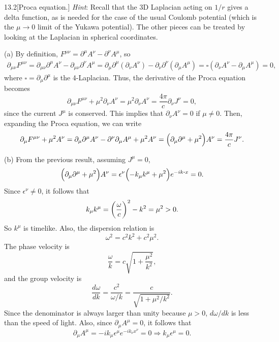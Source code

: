 \documentclass[12pt]{article}
\begin{document}
\begin{problem}{13.2}[Proca equation.]
\textit{Hint}: Recall that the 3D Laplacian acting on $1/r$ gives a delta
function, as is needed for the case of the usual Coulomb potential (which is the
$\mu\to0$ limit of the Yukawa potential). The other pieces can be treated by
looking at the Laplacian in spherical coordinates.
\begin{solution}
(a) By definition, $F^{\mu\nu}=\partial^\mu A^\nu-\partial^\nu A^\mu$, so
\begin{align}
    \partial_{\mu\nu} F^{\mu\nu} 
    =\partial_{\mu\nu}\partial^\mu A^\nu-\partial_{\mu\nu}\partial^\nu A^\mu
    =\partial_\mu\partial^\mu(\partial_\nu A^\nu)
    -\partial_\nu\partial^\nu(\partial_\mu A^\mu)
    =\square(\partial_\nu A^\nu-\partial_\mu A^\mu)
    =0,
\end{align}
where $\square=\partial_\mu\partial^\mu$ is the 4-Laplacian. Thus, the
derivative of the Proca equation becomes
\begin{equation}
    \partial_{\mu\nu}F^{\mu\nu}+\mu^2\partial_\nu A^\nu
    =\mu^2\partial_\nu A^\nu=\frac{4\pi}{c}\partial_\nu J^\nu=0,
\end{equation}
since the current $J^\mu$ is conserved. This implies that $\partial_\nu A^\nu=0$
if $\mu\neq0$. Then, expanding the Proca equation, we can write
\begin{equation}
    \partial_\mu F^{\mu\nu}+\mu^2A^\nu=\partial_\mu\partial^\mu A^\nu
    -\partial^\nu\partial_\mu A^\mu+\mu^2A^\nu
    =\qty(\partial_\mu\partial^\mu+\mu^2)A^\nu=\frac{4\pi}{c}J^\nu.
\end{equation}

(b) From the previous result, assuming $J^\mu=0$,
\begin{equation}
    \qty(\partial_\mu\partial^\mu+\mu^2)A^\nu
    =\epsilon^\nu\qty(-k_\mu k^\mu+\mu^2)e^{-ik\vdot x}=0.
\end{equation}
Since $\epsilon^\nu\neq0$, it follows that
\begin{equation}
    k_\mu k^\mu=\qty(\frac{\omega}{c})^2-k^2=\mu^2>0. 
\end{equation}
So $k^\mu$ is timelike. Also, the dispersion relation is
\begin{equation}
    \omega^2=c^2k^2+c^2\mu^2. 
\end{equation}
The phase velocity is
\begin{equation}
    \frac{\omega}{k}=c\sqrt{1+\frac{\mu^2}{k^2}}, 
\end{equation}
and the group velocity is
\begin{equation}
    \frac{d\omega}{dk}=\frac{c^2}{\omega/k} 
    =\frac{c}{\sqrt{1+\mu^2/k^2}}.
\end{equation}
Since the denominator is always larger than unity because $\mu>0$, $d\omega/dk$
is less than the speed of light. Also, since $\partial_\mu A^\mu=0$, it follows
that
\begin{equation}
    \partial_\mu A^\mu=-ik_\mu\epsilon^\mu e^{-ik_\nu x^\nu}=0
    \Rightarrow k_\mu \epsilon^\mu=0.
\end{equation}


\end{solution}
\end{problem}
\end{document}
